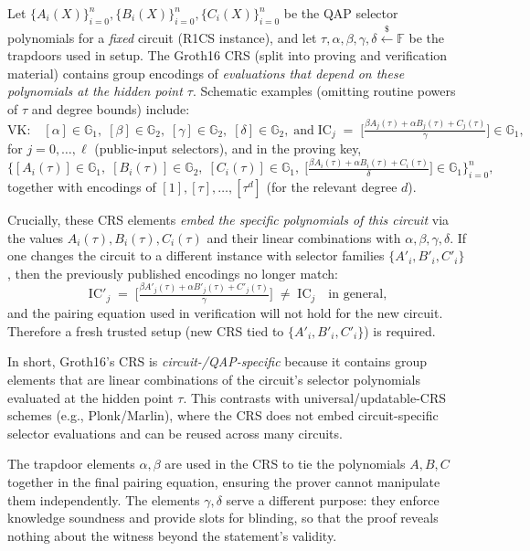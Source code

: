 \myspace

\begin{remark}
Let $\{A_i(X)\}_{i=0}^n,\{B_i(X)\}_{i=0}^n,\{C_i(X)\}_{i=0}^n$ be the QAP selector polynomials
for a \emph{fixed} circuit (R1CS instance), and let $\tau,\alpha,\beta,\gamma,\delta \xleftarrow{\$}\mathbb{F}$
be the trapdoors used in setup.  The Groth16 CRS (split into proving and verification material)
contains group encodings of \emph{evaluations that depend on these polynomials at the hidden point $\tau$}.
Schematic examples (omitting routine powers of $\tau$ and degree bounds) include:
\[
\text{VK:}\quad 
[\alpha] \in \mathbb{G}_1,\; [\beta]\in \mathbb{G}_2,\; [\gamma]\in \mathbb{G}_2,\; [\delta]\in \mathbb{G}_2,\;
\text{and}\;
\mathrm{IC}_j \;=\; \Big[\tfrac{\beta A_j(\tau)+\alpha B_j(\tau)+C_j(\tau)}{\gamma}\Big]\in\mathbb{G}_1,
\]
for $j=0,\dots,\ell$ (public-input selectors), and in the proving key,
\[
\big\{[A_i(\tau)]\in\mathbb{G}_1,\; [B_i(\tau)]\in\mathbb{G}_2,\; [C_i(\tau)]\in\mathbb{G}_1,\;
\Big[\tfrac{\beta A_i(\tau)+\alpha B_i(\tau)+C_i(\tau)}{\delta}\Big]\in\mathbb{G}_1\big\}_{i=0}^n,
\]
together with encodings of $[1],[\tau],\ldots,[\tau^d]$ (for the relevant degree $d$).

Crucially, these CRS elements \emph{embed the specific polynomials of this circuit} via the values
$A_i(\tau),B_i(\tau),C_i(\tau)$ and their linear combinations with $\alpha,\beta,\gamma,\delta$.
If one changes the circuit to a different instance with selector families
$\{A'_i,B'_i,C'_i\}$, then the previously published encodings no longer match:
\[
\mathrm{IC}'_j \;=\; \Big[\tfrac{\beta A'_j(\tau)+\alpha B'_j(\tau)+C'_j(\tau)}{\gamma}\Big] \;\neq\; \mathrm{IC}_j
\quad\text{in general,}
\]
and the pairing equation used in verification will not hold for the new circuit.
Therefore a fresh trusted setup (new CRS tied to $\{A'_i,B'_i,C'_i\}$) is required.

In short, Groth16’s CRS is \emph{circuit-/QAP-specific} because it contains group elements
that are linear combinations of the circuit’s selector polynomials evaluated at the hidden point $\tau$.
This contrasts with universal/updatable-CRS schemes (e.g., Plonk/Marlin), where the CRS
does not embed circuit-specific selector evaluations and can be reused across many circuits.
\end{remark}


\myspace

\begin{remark}
The trapdoor elements $\alpha,\beta$ are used in the CRS to tie the 
polynomials $A,B,C$ together in the final pairing equation, ensuring 
the prover cannot manipulate them independently.  
The elements $\gamma,\delta$ serve a different purpose: they enforce 
knowledge soundness and provide slots for blinding, so that the proof 
reveals nothing about the witness beyond the statement’s validity.
\end{remark}

